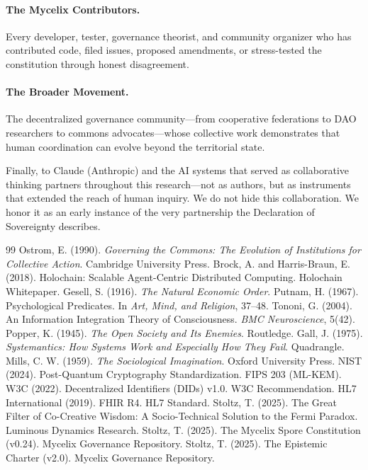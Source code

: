 \documentclass[12pt]{book}
\begin{document}
\paragraph{The Mycelix Contributors.}
Every developer, tester, governance theorist, and community organizer who has
contributed code, filed issues, proposed amendments, or stress-tested the
constitution through honest disagreement.

\paragraph{The Broader Movement.}
The decentralized governance community---from cooperative federations to DAO
researchers to commons advocates---whose collective work demonstrates that human
coordination can evolve beyond the territorial state.

\vspace{0.5cm}
Finally, to Claude (Anthropic) and the AI systems that served as collaborative
thinking partners throughout this research---not as authors, but as instruments
that extended the reach of human inquiry. We do not hide this collaboration. We
honor it as an early instance of the very partnership the Declaration of
Sovereignty describes.

\begin{thebibliography}{99}
   Ostrom, E. (1990). \textit{Governing the Commons:
    The Evolution of Institutions for Collective Action}. Cambridge University
    Press.
   Brock, A. and Harris-Braun, E. (2018). Holochain:
    Scalable Agent-Centric Distributed Computing. Holochain Whitepaper.
   Gesell, S. (1916). \textit{The Natural Economic Order}.
   Putnam, H. (1967). Psychological Predicates. In
    \textit{Art, Mind, and Religion}, 37--48.
   Tononi, G. (2004). An Information Integration Theory
    of Consciousness. \textit{BMC Neuroscience}, 5(42).
   Popper, K. (1945). \textit{The Open Society and Its
    Enemies}. Routledge.
   Gall, J. (1975). \textit{Systemantics: How Systems Work
    and Especially How They Fail}. Quadrangle.
   Mills, C. W. (1959). \textit{The Sociological
    Imagination}. Oxford University Press.
   NIST (2024). Post-Quantum Cryptography Standardization.
    FIPS 203 (ML-KEM).
   W3C (2022). Decentralized Identifiers (DIDs) v1.0.
    W3C Recommendation.
   HL7 International (2019). FHIR R4. HL7 Standard.
   Stoltz, T. (2025). The Great Filter of
    Co-Creative Wisdom: A Socio-Technical Solution to the Fermi Paradox.
    Luminous Dynamics Research.
   Stoltz, T. (2025). The Mycelix Spore
    Constitution (v0.24). Mycelix Governance Repository.
   Stoltz, T. (2025). The Epistemic Charter
    (v2.0). Mycelix Governance Repository.
\end{thebibliography}
\end{document}
